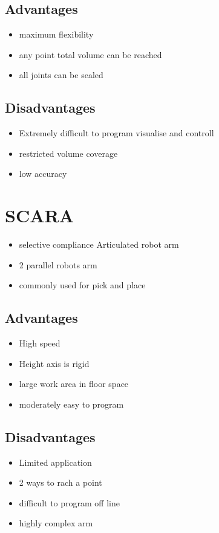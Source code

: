 \documentclass{article}
\begin{document}
\subsection{Advantages}
\begin{itemize}
	\item maximum flexibility
	\item any point total volume can be reached
	\item all joints can be sealed
\end{itemize}
\subsection{Disadvantages}
\begin{itemize}
	\item Extremely difficult to program visualise and controll
	\item restricted volume coverage
	\item low accuracy
\end{itemize}
\section{SCARA }
\begin{itemize}
	\item selective compliance Articulated robot arm
	\item 2 parallel robots arm
	\item commonly used for pick and place
\end{itemize}
\subsection{Advantages}
\begin{itemize}
    \item High speed 
    \item Height axis is rigid 
    \item large work area in floor space 
    \item moderately easy to program
\end{itemize}
\subsection{Disadvantages}
\begin{itemize}
    \item Limited application
    \item 2 ways to rach a point
    \item difficult to program off line
    \item highly complex arm
\end{itemize}
\end{document}
